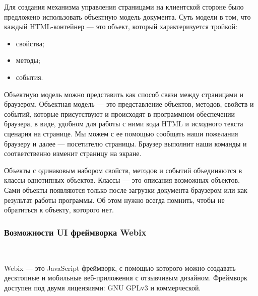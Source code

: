 Для создания механизма управления страницами на клиентской стороне было предложено использовать объектную модель документа. Суть модели в том, что каждый HTML-контейнер — это объект, который характеризуется тройкой:

\begin{itemize}
  \item свойства;
  \item методы;
  \item события.
\end{itemize}

Объектную модель можно представить как способ связи между страницами и браузером. Объектная модель — это представление объектов, методов, свойств и событий, которые присутствуют и происходят в программном обеспечении браузера, в виде, удобном для работы с ними кода HTML и исходного текста сценария на странице. Мы можем с ее помощью сообщать наши пожелания браузеру и далее — посетителю страницы. Браузер выполнит наши команды и соответственно изменит страницу на экране.

Объекты с одинаковым набором свойств, методов и событий объединяются в классы однотипных объектов. Классы — это описания возможных объектов. Сами объекты появляются только после загрузки документа браузером или как результат работы программы. Об этом нужно всегда помнить, чтобы не обратиться к объекту, которого нет.

\subsubsection{Возможности UI фреймворка Webix}
\

Webix — это JavaScript фреймворк, с помощью которого можно создавать десктопные и мобильные веб-приложения с отзывчивым дизайном. Фреймворк доступен под двумя лицензиями: GNU GPLv3 и коммерческой. 